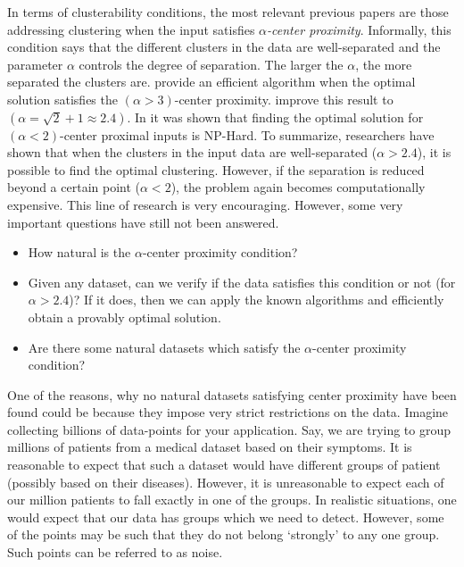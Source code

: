\documentclass[11pt]{article}
\begin{document}
In terms of clusterability conditions, the most relevant previous papers are those addressing clustering when the input satisfies {\em $\alpha$-center proximity}. Informally, this condition says that the different clusters in the data are well-separated and the parameter $\alpha$ controls the degree of separation. The larger the $\alpha$, the more separated the clusters are. \cite{awasthi2012center} provide an efficient algorithm when the optimal solution satisfies the $(\alpha > 3)$-center proximity. \cite{balcan2012clustering} improve this result to $(\alpha = \sqrt{2} + 1 \approx 2.4)$. In \cite{ben2014data} it was shown that finding the optimal solution for $(\alpha <2)$-center proximal inputs is NP-Hard. To summarize, researchers have shown that when the clusters in the input data are well-separated ($\alpha > 2.4$), it is possible to find the optimal clustering. However, if the separation is reduced beyond a certain point ($\alpha < 2$), the problem again becomes computationally expensive. This line of research is very encouraging. However, some very important questions have still not been answered. 
\begin{itemize}[nolistsep]
\item How natural is the $\alpha$-center proximity condition?
\item Given any dataset, can we verify if the data satisfies this condition or not (for $\alpha > 2.4$)? If it does, then we can apply the known algorithms and efficiently obtain a provably optimal solution. 
\item Are there some natural datasets which satisfy the $\alpha$-center proximity condition? 
\end{itemize}

\vspace{0.1in}\noindent One of the reasons, why no natural datasets satisfying center proximity have been found could be because they impose very strict restrictions on the data. Imagine collecting billions of data-points for your application. Say, we are trying to group millions of patients from a medical dataset based on their symptoms. It is reasonable to expect that such a dataset would have different groups of patient (possibly based on their diseases). However, it is unreasonable to expect each of our million patients to fall exactly in one of the groups. In realistic situations, one would expect that our data has groups which we need to detect. However, some of the points may be such that they do not belong `strongly' to any one group. Such points can be referred to as noise. 
\end{document}
